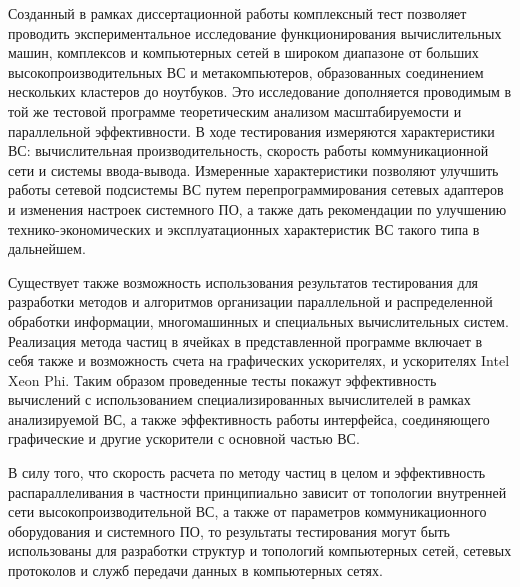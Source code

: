 Созданный в рамках диссертационной работы комплексный тест позволяет проводить экспериментальное исследование функционирования вычислительных машин, комплексов и компьютерных сетей в широком диапазоне от больших высокопроизводительных ВС и метакомпьютеров, образованных соединением нескольких кластеров до ноутбуков. Это исследование дополняется проводимым в той же тестовой программе теоретическим анализом масштабируемости и параллельной эффективности. В ходе тестирования измеряются характеристики ВС: вычислительная производительность, скорость работы коммуникационной сети и системы ввода-вывода. Измеренные характеристики позволяют улучшить работы сетевой подсистемы ВС путем перепрограммирования сетевых адаптеров и изменения настроек системного ПО, а также дать рекомендации по улучшению технико-экономических и эксплуатационных характеристик ВС такого типа в дальнейшем.


Существует также возможность использования результатов тестирования для разработки методов и алгоритмов организации параллельной и распределенной обработки информации, многомашинных и специальных вычислительных систем. Реализация
метода частиц в ячейках в представленной программе включает в себя также и возможность счета на графических ускорителях, и ускорителях Intel Xeon Phi. Таким образом проведенные тесты покажут эффективность вычислений с использованием специализированных вычислителей в рамках анализируемой ВС, а также эффективность работы интерфейса, соединяющего графические и другие ускорители с основной частью ВС.

В силу того, что скорость расчета по методу частиц в целом и эффективность распараллеливания в частности принципиально зависит от топологии внутренней сети высокопроизводительной ВС, а также от параметров коммуникационного оборудования и системного ПО, то результаты тестирования могут быть использованы для разработки структур и топологий компьютерных сетей, сетевых протоколов и служб передачи данных в компьютерных сетях.

